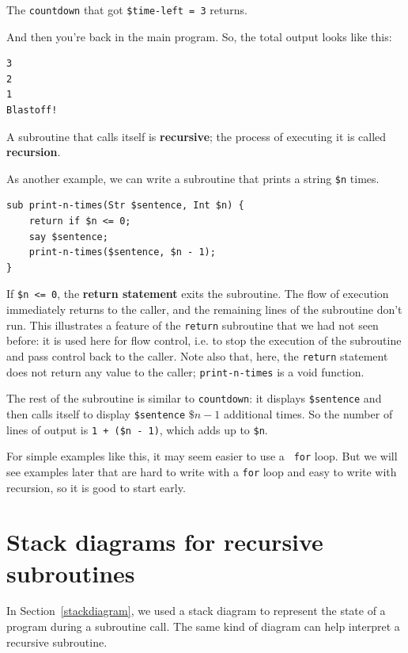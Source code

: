 The {\tt countdown} that got {\tt \$time-left = 3} returns.

And then you're back in the main program.  So, the
total output looks like this:

\begin{verbatim}
3
2
1
Blastoff!
\end{verbatim}
%
A subroutine that calls itself is {\bf recursive}; the process of
executing it is called {\bf recursion}.

As another example, we can write a subroutine that prints a
string {\tt \$n} times.

\begin{verbatim}
sub print-n-times(Str $sentence, Int $n) {
    return if $n <= 0;
    say $sentence;
    print-n-times($sentence, $n - 1);
}
\end{verbatim}
%
If {\tt \$n <= 0}, the {\bf return statement} exits the
subroutine.  The flow of execution immediately returns to 
the caller, and the remaining lines of the subroutine don't
run. This illustrates a feature of the {\tt return} subroutine 
that we had not seen before: it is used here for flow 
control, i.e. to stop the execution of the subroutine and 
pass control back to the caller. Note also that, here, the 
{\tt return} statement does not return any value to the 
caller; {\tt print-n-times} is a void function.


The rest of the subroutine is similar to {\tt countdown}: it 
displays {\tt \$sentence} and then calls itself to display 
{\tt \$sentence} $\$n - 1$ additional times.  So the number 
of lines of output is {\tt 1 + (\$n - 1)}, which
adds up to {\tt \$n}.

For simple examples like this, it may seem easier to use a {\tt
for} loop.  But we will see examples later that are hard to write
with a {\tt for} loop and easy to write with recursion, so it is
good to start early.


\section{Stack diagrams for recursive subroutines}
\label{recursive.stack}

In Section~\ref{stackdiagram}, we used a stack diagram to represent
the state of a program during a subroutine call.  The same kind of
diagram can help interpret a recursive subroutine.

